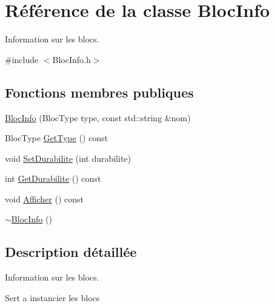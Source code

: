 \hypertarget{class_bloc_info}{\section{Référence de la classe Bloc\-Info}
\label{class_bloc_info}
}


Information sur les blocs.  




{\ttfamily \#include $<$Bloc\-Info.\-h$>$}

\subsection*{Fonctions membres publiques}
\begin{DoxyCompactItemize}
\item 
\hyperlink{class_bloc_info_af3d37558770983e57ec830853320bc70}{Bloc\-Info} (Bloc\-Type type, const std\-::string \&nom)
\item 
Bloc\-Type \hyperlink{class_bloc_info_af4ca02344c84577f9277515fd45efcb1}{Get\-Type} () const 
\item 
void \hyperlink{class_bloc_info_a330c9339182163e0c99777bc93fdefe3}{Set\-Durabilite} (int durabilite)
\item 
int \hyperlink{class_bloc_info_a2b6c4249b92552af142131392fc47a82}{Get\-Durabilite} () const 
\item 
void \hyperlink{class_bloc_info_ab46b553613ebcb15891663024c61e89b}{Afficher} () const 
\item 
\hyperlink{class_bloc_info_a8026479e9c52e9ac0c9f737acdd8798b}{$\sim$\-Bloc\-Info} ()
\end{DoxyCompactItemize}


\subsection{Description détaillée}
Information sur les blocs. 

Sert a instancier les blocs 

